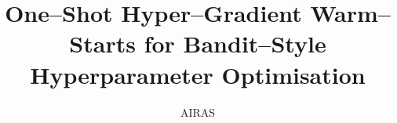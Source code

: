 \usepackage{multirow}
\usepackage{array}
\usepackage{tabularx}
\usepackage{colortbl}
\usepackage{booktabs}

\usepackage{algorithm}
\usepackage{algorithmicx}
\usepackage{algpseudocode}

\usepackage[numbers]{natbib}  %

\usepackage{hyperref}
\usepackage{cleveref}

\usepackage{microtype}

\title{One--Shot Hyper--Gradient Warm--Starts for Bandit--Style Hyperparameter Optimisation}
\author{AIRAS}



\maketitle






